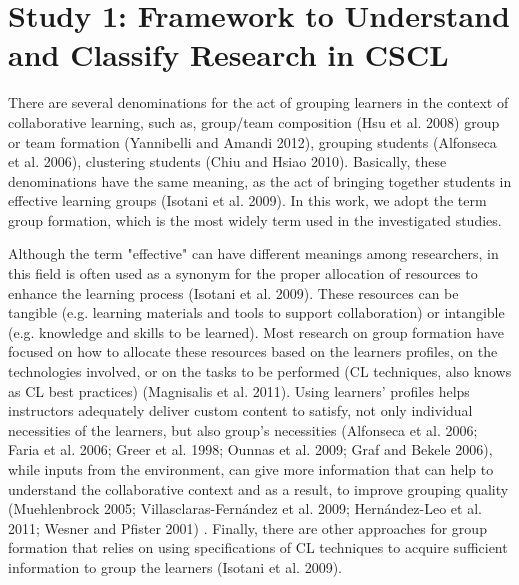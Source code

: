 \section{Study 1: Framework to Understand and Classify Research in CSCL}

There are several denominations for the act of grouping learners in the context of collaborative learning, such as, group/team composition (Hsu et al. 2008) group or team formation (Yannibelli and Amandi 2012), grouping students (Alfonseca et al. 2006), clustering students (Chiu and Hsiao 2010). Basically, these denominations have the same meaning, as the act of bringing together students in effective learning groups (Isotani et al. 2009). In this work, we adopt the term group formation, which is the most widely term used in the investigated studies.

Although the term "effective" can have different meanings among researchers, in this field is often used as a synonym for the proper allocation of resources to enhance the learning process (Isotani et al. 2009). These resources can be tangible (e.g. learning materials and tools to support collaboration) or intangible (e.g. knowledge and skills to be learned). Most research on group formation have focused on how to allocate these resources based on the learners profiles, on the technologies involved, or on the tasks to be performed (CL techniques, also knows as CL best practices) (Magnisalis et al. 2011).
Using learners' profiles helps instructors adequately deliver custom content to satisfy, not only individual necessities of the learners, but also group's necessities (Alfonseca et al. 2006; Faria et al. 2006; Greer et al. 1998; Ounnas et al. 2009; Graf and Bekele 2006), while inputs from the environment, can give more information that can help to understand the collaborative context and as a result, to improve grouping quality (Muehlenbrock 2005; Villasclaras-Fernández et al. 2009; Hernández-Leo et al. 2011; Wesner and Pfister 2001) . Finally, there are other approaches for group formation that relies on using specifications of CL techniques to acquire sufficient information to group the learners (Isotani et al. 2009). 

